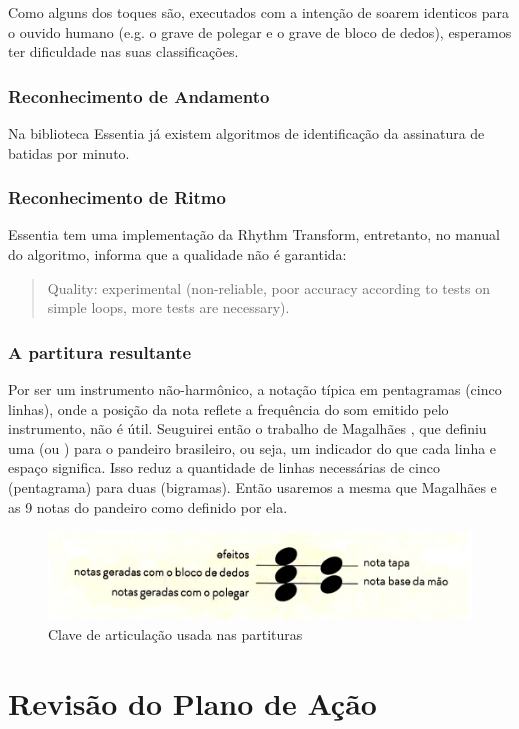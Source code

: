 \documentclass[
  dissertacao,
  brazil
]{ThesisPUC}
\begin{document}
Como alguns dos toques são, executados com a intenção de soarem identicos para o ouvido humano (e.g. o grave de polegar e o grave de bloco de dedos), esperamos ter dificuldade nas suas classificações.

\subsection{Reconhecimento de Andamento}
Na biblioteca Essentia já existem algoritmos de identificação da assinatura de batidas por minuto.

\subsection{Reconhecimento de Ritmo}
Essentia tem uma implementação da Rhythm Transform, entretanto, no manual do algoritmo, informa que a qualidade não é garantida:
\begin{quote}
    Quality: experimental (non-reliable, poor accuracy according to tests on simple loops, more tests are necessary).
\end{quote}

\subsection{A partitura resultante}
Por ser um instrumento não-harmônico, a notação típica em pentagramas (cinco linhas), onde a posição da nota reflete a frequência do som emitido pelo instrumento, não é útil. Seuguirei então o trabalho de Magalhães \cite{magalhaes2018tecnica}, que definiu uma \CA (ou \ca) para o pandeiro brasileiro, ou seja, um indicador do que cada linha e espaço significa. Isso reduz a quantidade de linhas necessárias de cinco (pentagrama) para duas (bigramas). Então usaremos a mesma \ca que Magalhães e as 9 notas do pandeiro como definido por ela.
\begin{figure}
    \centering
    \includegraphics[width=\textwidth]{ClaveDeArticulacao.jpg}
    \caption{Clave de articulação usada nas partituras}
    \label{fig:clave}
\end{figure}


\chapter{Revisão do Plano de Ação}
\end{document}
